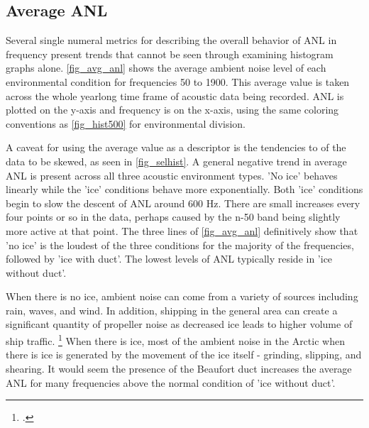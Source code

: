 \subsection{Average ANL} \label{sec_avg_anl}
Several single numeral metrics for describing the overall behavior of ANL in frequency present trends that cannot be seen through examining histogram graphs alone. \autoref{fig_avg_anl} shows the average ambient noise level of each environmental condition for frequencies 50 to 1900. This average value is taken across the whole yearlong time frame of acoustic data being recorded. ANL is plotted on the y-axis and frequency is on the x-axis, using the same coloring conventions as \autoref{fig_hist500} for environmental division.

A caveat for using the average value as a descriptor is the tendencies to of the data to be skewed, as seen in \autoref{fig_selhist}. A general negative trend in average ANL is present across all three acoustic environment types. 'No ice' behaves linearly while the 'ice' conditions behave more exponentially. Both 'ice' conditions begin to slow the descent of ANL around 600 Hz. There are small increases every four points or so in the data, perhaps caused by the n-50 band being slightly more active at that point. The three lines of \autoref{fig_avg_anl} definitively show that 'no ice' is the loudest of the three conditions for the majority of the frequencies, followed by 'ice with duct'. The lowest levels of ANL typically reside in 'ice without duct'.

When there is no ice, ambient noise can come from a variety of sources including rain, waves, and wind. In addition, shipping in the general area can create a significant quantity of propeller noise as decreased ice leads to higher volume of ship traffic. \footcite[]{ship_traffic} When there is ice, most of the ambient noise in the Arctic when there is ice is generated by the movement of the ice itself - grinding, slipping, and shearing. It would seem the presence of the Beaufort duct increases the average ANL for many frequencies above the normal condition of 'ice without duct'. 



